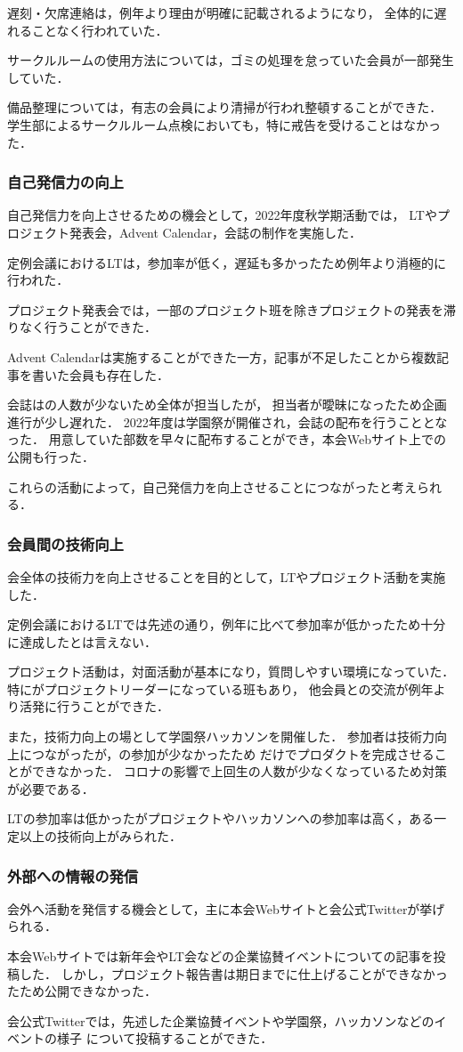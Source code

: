     遅刻・欠席連絡は，例年より理由が明確に記載されるようになり，
    全体的に遅れることなく行われていた．
    
    サークルルームの使用方法については，ゴミの処理を怠っていた会員が一部発生していた．
    
    備品整理については，有志の会員により清掃が行われ整頓することができた．
    学生部によるサークルルーム点検においても，特に戒告を受けることはなかった．

\subsubsection*{自己発信力の向上}
    自己発信力を向上させるための機会として，2022年度秋学期活動では，
    LTやプロジェクト発表会，Advent Calendar，会誌の制作を実施した．

    定例会議におけるLTは，参加率が低く，遅延も多かったため例年より消極的に行われた．

    プロジェクト発表会では，一部のプロジェクト班を除きプロジェクトの発表を滞りなく行うことができた．
    
    Advent Calendarは実施することができた一方，記事が不足したことから複数記事を書いた会員も存在した．

    会誌は\secondGrade{}の人数が少ないため\secondGrade{}全体が担当したが，
    担当者が曖昧になったため企画進行が少し遅れた．
    2022年度は学園祭が開催され，会誌の配布を行うこととなった．
    用意していた部数を早々に配布することができ，本会Webサイト上での公開も行った．
    
    これらの活動によって，自己発信力を向上させることにつながったと考えられる．
    
\subsubsection*{会員間の技術向上}
    会全体の技術力を向上させることを目的として，LTやプロジェクト活動を実施した．

    定例会議におけるLTでは先述の通り，例年に比べて参加率が低かったため十分に達成したとは言えない．

    プロジェクト活動は，対面活動が基本になり，質問しやすい環境になっていた．
    特に\firstGrade{}がプロジェクトリーダーになっている班もあり，
    他会員との交流が例年より活発に行うことができた．

    また，技術力向上の場として学園祭ハッカソンを開催した．
    参加者は技術力向上につながったが，\thirdGrade{}の参加が少なかったため
    \firstGrade{}だけでプロダクトを完成させることができなかった．
    コロナの影響で上回生の人数が少なくなっているため対策が必要である．
    
    LTの参加率は低かったがプロジェクトやハッカソンへの参加率は高く，ある一定以上の技術向上がみられた．

\subsubsection*{外部への情報の発信}
    会外へ活動を発信する機会として，主に本会Webサイトと会公式Twitterが挙げられる．

    本会Webサイトでは新年会やLT会などの企業協賛イベントについての記事を投稿した．
    しかし，プロジェクト報告書は期日までに仕上げることができなかったため公開できなかった．

    会公式Twitterでは，先述した企業協賛イベントや学園祭，ハッカソンなどのイベントの様子
    について投稿することができた．
